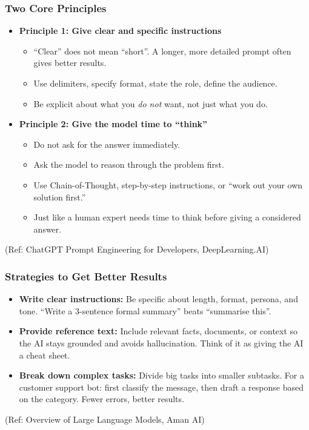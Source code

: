\begin{frame}[fragile]\frametitle{Two Core Principles}

\begin{itemize}
\item \textbf{Principle 1: Give clear and specific instructions}
  \begin{itemize}
  \item ``Clear'' does not mean ``short''. A longer, more detailed prompt often gives better results.
  \item Use delimiters, specify format, state the role, define the audience.
  \item Be explicit about what you \emph{do not} want, not just what you do.
  \end{itemize}

\medskip
\item \textbf{Principle 2: Give the model time to ``think''}
  \begin{itemize}
  \item Do not ask for the answer immediately.
  \item Ask the model to reason through the problem first.
  \item Use Chain-of-Thought, step-by-step instructions, or ``work out your own solution first.''
  \item Just like a human expert needs time to think before giving a considered answer.
  \end{itemize}
\end{itemize}

{\tiny (Ref: ChatGPT Prompt Engineering for Developers, DeepLearning.AI)}

\end{frame}


\begin{frame}[fragile]\frametitle{Strategies to Get Better Results}

\begin{itemize}
\item \textbf{Write clear instructions:} Be specific about length, format, persona, and tone. ``Write a 3-sentence formal summary'' beats ``summarise this''.

\medskip
\item \textbf{Provide reference text:} Include relevant facts, documents, or context so the AI stays grounded and avoids hallucination. Think of it as giving the AI a cheat sheet.

\medskip
\item \textbf{Break down complex tasks:} Divide big tasks into smaller subtasks. For a customer support bot: first classify the message, then draft a response based on the category. Fewer errors, better results.
\end{itemize}

{\tiny (Ref: Overview of Large Language Models, Aman AI)}

\end{frame}

